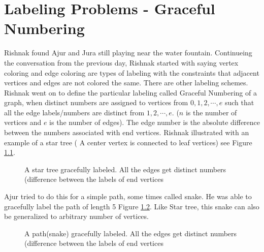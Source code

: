 \chapter{Labeling Problems - Graceful Numbering}

Rishnak found Ajur and Jura still playing near the water fountain. Continueing the conversation from the previous day, Rishnak started with saying vertex coloring and edge coloring are types of labeling with the constraints that adjacent vertices and edges are not colored the same. There are other labeling schemes. Rishnak went on to define the particular labeling called Graceful Numbering of a graph, when distinct numbers are assigned to vertices  from $0, 1,2, \cdots, e$ such that all the edge labels/numbers are distinct from $1,2, \cdots, e$. ($n$ is the number of vertices and $e$ is the number of edges). The edge number is the absolute difference between the numbers associated with end vertices.
Rishnak illustrated with an example of a star tree ( A center vertex is connected to leaf vertices) see Figure \ref{19g1}.

\begin{figure}
\begin{center}
\caption{A star tree gracefully labeled. All the edges get distinct numbers (difference between the labels of end vertices}\label{19g1}
\end{center}
\end{figure}
Ajur tried to do this for a simple path, some times called snake. He was able to gracefully label the path of length 5 Figure \ref{19g2}. Like Star tree, this snake can also be generalized to arbitrary number of vertices.

\begin{figure}
\begin{center}
\caption{A path(snake) gracefully labeled. All the edges get distinct numbers (difference between the labels of end vertices}\label{19g2}
\end{center}
\end{figure}

